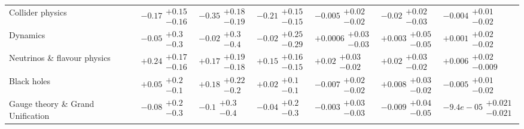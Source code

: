 \begin{tabular}{lllllll}
Collider physics                          &    $\bm{-0.17}\substack{+0.15 \\ -0.16}$ &    $\bm{-0.35}\substack{+0.18 \\ -0.19}$ &    $\bm{-0.21}\substack{+0.15 \\ -0.15}$ &        $-0.005\substack{+0.02 \\ -0.02}$ &    $\bm{-0.02}\substack{+0.02 \\ -0.03}$ &        $-0.004\substack{+0.01 \\ -0.02}$ \\
Dynamics                                  &           $-0.05\substack{+0.3 \\ -0.3}$ &           $-0.02\substack{+0.3 \\ -0.4}$ &         $-0.02\substack{+0.25 \\ -0.29}$ &       $+0.0006\substack{+0.03 \\ -0.03}$ &        $+0.003\substack{+0.05 \\ -0.05}$ &        $+0.001\substack{+0.02 \\ -0.02}$ \\
Neutrinos \& flavour physics              &    $\bm{+0.24}\substack{+0.17 \\ -0.16}$ &         $+0.17\substack{+0.19 \\ -0.18}$ &    $\bm{+0.15}\substack{+0.16 \\ -0.15}$ &         $+0.02\substack{+0.03 \\ -0.02}$ &         $+0.02\substack{+0.03 \\ -0.02}$ &       $+0.006\substack{+0.02 \\ -0.009}$ \\
Black holes                               &           $+0.05\substack{+0.2 \\ -0.1}$ &          $+0.18\substack{+0.22 \\ -0.2}$ &           $+0.02\substack{+0.1 \\ -0.1}$ &        $-0.007\substack{+0.02 \\ -0.02}$ &        $+0.008\substack{+0.03 \\ -0.02}$ &        $-0.005\substack{+0.01 \\ -0.02}$ \\
Gauge theory \& Grand Unification         &           $-0.08\substack{+0.2 \\ -0.3}$ &            $-0.1\substack{+0.3 \\ -0.4}$ &           $-0.04\substack{+0.2 \\ -0.3}$ &        $-0.003\substack{+0.03 \\ -0.03}$ &        $-0.009\substack{+0.04 \\ -0.05}$ &    $-9.4e-05\substack{+0.021 \\ -0.021}$ \\

\end{tabular}
